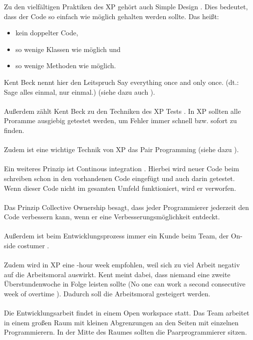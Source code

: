 \documentclass[a4paper, 10pt]{scrartcl}
\begin{document}
Zu den vielfältigen Praktiken des XP gehört auch \glqq Simple Design\grqq{} \citep{beck1999}. Dies bedeutet, dass der Code so einfach wie möglich gehalten werden sollte. Das heißt: 
\begin{itemize}
\item kein doppelter Code, 
\item so wenige Klassen wie möglich und
\item so wenige Methoden wie möglich.
\end{itemize}
Kent Beck nennt hier den Leitspruch \glqq Say everything once and only once. (dt.: Sage alles einmal, nur einmal.)\grqq \cite{beck1999} (siehe dazu auch ).\\\\
Außerdem zählt Kent Beck zu den Techniken des XP \glqq Tests\grqq{} \citep{beck1999}. In XP sollten alle Proramme ausgiebig getestet werden, um Fehler immer schnell bzw. sofort zu finden.\\\\
Zudem ist eine wichtige Technik von XP das \glqq Pair Programming\grqq{} \citep{beck1999} (siehe dazu ).\\\\
Ein weiteres Prinzip ist \glqq Continous integration\grqq{} \citep{beck1999}. Hierbei  wird neuer Code beim schreiben schon in den vorhandenen Code eingefügt und auch darin getestet. Wenn dieser Code nicht im gesamten Umfeld funktioniert, wird er verworfen.\\\\
Das Prinzip \glqq Collective Ownership\grqq{} \citep{beck1999} besagt, dass jeder Programmierer jederzeit den Code verbessern kann, wenn er eine Verbesserungsmöglichkeit entdeckt.\\\\
Außerdem ist beim Entwicklungsprozess immer ein Kunde beim Team, der \glqq On-side costumer\grqq{} \citep{beck1999}.\\\\
Zudem wird in XP eine -hour week\grqq{} \citep{beck1999} empfohlen, weil sich zu viel Arbeit negativ auf die Arbeitsmoral auswirkt. Kent meint dabei, dass niemand eine zweite Überstundenwoche in Folge leisten sollte (\glqq No one can work a second consecutive week of overtime\grqq{} \cite{beck1999}). Dadurch soll die Arbeitsmoral gesteigert werden.\\\\
Die Entwicklungsarbeit findet in einem \glqq Open workspace\grqq{} \citep{beck1999} statt. Das Team arbeitet in einem großen Raum mit kleinen Abgrenzungen an den Seiten mit einzelnen Programmierern. In der Mitte des Raumes sollten die Paarprogrammierer sitzen.\\\\
\end{document}

